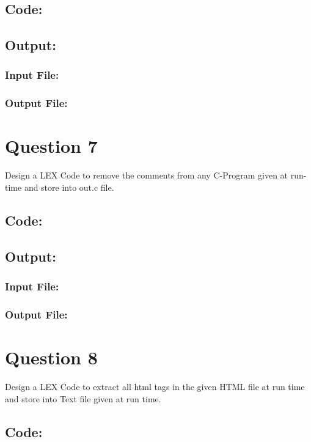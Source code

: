 \documentclass{article}
\begin{document}
\subsection*{Code:}

\newpage
\subsection*{Output:}
\subsubsection*{Input File:}

\subsubsection*{Output File:}


\newpage
\section*{Question 7}
Design a LEX Code to remove the comments from any C-Program
given at run-time and store into out.c file.
\subsection*{Code:}

\newpage
\subsection*{Output:}
\subsubsection*{Input File:}

\subsubsection*{Output File:}


\newpage
\section*{Question 8}
Design a LEX Code to extract all html tags in the given HTML file
at run time and store into Text file given at run time.
\subsection*{Code:}

\newpage
\end{document}
